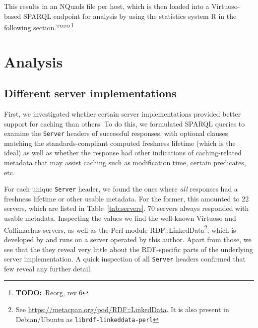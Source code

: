 \documentclass{llncs}
\newcommand{\httph}[1]{\texttt{#1}}
\newcommand{\todo}[1]{\ensuremath{^{\textrm{\tiny{TODO}\normalsize}}}\footnote{\textbf{TODO:}~#1}}
\begin{document}
This results in an NQuads file per host, which is then loaded into a
Virtuoso-based SPARQL endpoint for analysis by using the statistics
system R\cite{kn:r} in the following section.\todo{Reorg, rev 6}

\section{Analysis}

\subsection{Different server implementations}

First, we investigated whether certain server implementations provided
better support for caching than others. To do this, we formulated
SPARQL queries to examine the \httph{Server} headers of successful
responses, with optional clauses matching the standards-compliant
computed freshness lifetime (which is the ideal) as well as whether
the response had other indications of caching-related metadata that
may assist caching such as modification time, certain predicates, etc.

For each unique \httph{Server} header, we found the ones where
\emph{all} responses had a freshness lifetime or other usable
metadata. For the former, this amounted to 22 servers, which are
listed in Table~\ref{tab:servers}.  70 servers always responded with
usable metadata. Inspecting the values we find the well-known Virtuoso
and Callimachus servers, as well as the Perl module
RDF::LinkedData\footnote{See
  \url{https://metacpan.org/pod/RDF::LinkedData}. It is also present
  in Debian/Ubuntu as \texttt{librdf-linkeddata-perl}}, which is
developed by and runs on a server operated by this author. Apart from
those, we see that the they reveal very little about the RDF-specific
parts of the underlying server implementation. A quick inspection of
all \httph{Server} headers confirmed that few reveal any further
detail.
\end{document}
